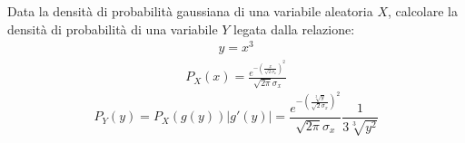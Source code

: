 \documentclass{article}
\begin{document}
Data la densità di probabilità gaussiana di una variabile aleatoria $X$, calcolare la densità di probabilità di una variabile $Y$ legata dalla relazione:
\begin{gather*}
    y=x^3
\end{gather*}
\begin{gather*}
    P_X(x)=\displaystyle\frac{e^{-\left(\frac{x}{\sqrt{2}{\sigma_x}}\right)^2}}{\sqrt{2\pi}\sigma_x}
\end{gather*}
\begin{equation}
    P_Y(y)=P_X(g(y))|g'(y)|=\displaystyle\frac{e^{-\left(\frac{\sqrt[3]{y}}{\sqrt{2}{\sigma_x}}\right)^2}}{\sqrt{2\pi}\sigma_x}\frac{1}{3\sqrt[3]{y^2}}
\end{equation}
\end{document}
